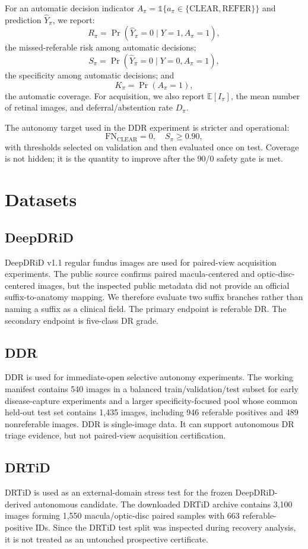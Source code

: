\documentclass[journal]{IEEEtran}
\begin{document}
For an automatic decision indicator $A_\pi=\mathbb{1}\{a_\pi\in\{\mathrm{CLEAR},\mathrm{REFER}\}\}$ and prediction $\widehat Y_\pi$, we report:
\[
R_\pi = \Pr(\widehat Y_\pi=0 \mid Y=1,A_\pi=1),
\]
the missed-referable risk among automatic decisions;
\[
S_\pi = \Pr(\widehat Y_\pi=0 \mid Y=0,A_\pi=1),
\]
the specificity among automatic decisions; and
\[
K_\pi = \Pr(A_\pi=1),
\]
the automatic coverage. For acquisition, we also report $\mathbb{E}[I_\pi]$, the mean number of retinal images, and deferral/abstention rate $D_\pi$.

The autonomy target used in the DDR experiment is stricter and operational:
\[
\mathrm{FN}_{\mathrm{CLEAR}}=0,\quad S_\pi \geq 0.90,
\]
with thresholds selected on validation and then evaluated once on test. Coverage is not hidden; it is the quantity to improve after the 90/0 safety gate is met.

\section{Datasets}
\subsection{DeepDRiD}
DeepDRiD v1.1 regular fundus images are used for paired-view acquisition experiments. The public source confirms paired macula-centered and optic-disc-centered images, but the inspected public metadata did not provide an official suffix-to-anatomy mapping. We therefore evaluate two suffix branches rather than naming a suffix as a clinical field. The primary endpoint is referable DR. The secondary endpoint is five-class DR grade.

\subsection{DDR}
DDR is used for immediate-open selective autonomy experiments. The working manifest contains 540 images in a balanced train/validation/test subset for early disease-capture experiments and a larger specificity-focused pool whose common held-out test set contains 1,435 images, including 946 referable positives and 489 nonreferable images. DDR is single-image data. It can support autonomous DR triage evidence, but not paired-view acquisition certification.

\subsection{DRTiD}
DRTiD is used as an external-domain stress test for the frozen DeepDRiD-derived autonomous candidate. The downloaded DRTiD archive contains 3,100 images forming 1,550 macula/optic-disc paired samples with 663 referable-positive IDs. Since the DRTiD test split was inspected during recovery analysis, it is not treated as an untouched prospective certificate.
\end{document}
